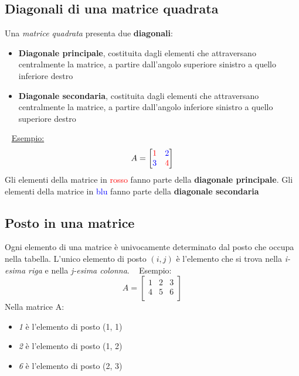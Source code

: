 \documentclass[11pt,oneside]{book}
\begin{document}
\subsection{Diagonali di una matrice quadrata}
Una \emph{matrice quadrata} presenta due \textbf{diagonali}:
\begin{itemize}
    \item \textbf{Diagonale principale}, costituita dagli elementi che attraversano centralmente la matrice,
          a partire dall'angolo superiore sinistro a quello inferiore destro
    \item \textbf{Diagonale secondaria}, costituita dagli elementi che attraversano centralmente la matrice,
          a partire dall'angolo inferiore sinistro a quello superiore destro
\end{itemize}
~\newline
\underline{Esempio:}
\begin{equation*}
    A =
    \begin{bmatrix}
        \color{red}1  & \color{blue}2 \\
        \color{blue}3 & \color{red}4  \\
    \end{bmatrix}
\end{equation*}
Gli elementi della matrice in \textcolor{red}{rosso}
fanno parte della \textbf{diagonale principale}. Gli elementi della matrice in \textcolor{blue}{blu} fanno
parte della \textbf{diagonale secondaria}

\subsection{Posto in una matrice}
Ogni elemento di una matrice è univocamente determinato dal posto che occupa nella tabella.
L'unico elemento di posto $(i,j)$ è l'elemento che si trova nella \emph{i-esima riga} e nella
\emph{j-esima colonna}. \newline
~\newline
Esempio:
\begin{equation*}
    A =
    \begin{bmatrix}
        1 & 2 & 3 \\
        4 & 5 & 6 \\
    \end{bmatrix}
\end{equation*}
Nella matrice A:
\begin{itemize}
    \item \emph{1} è l'elemento di posto (1, 1)
    \item \emph{2} è l'elemento di posto (1, 2)
    \item \emph{6} è l'elemento di posto (2, 3)
\end{itemize}
\end{document}
